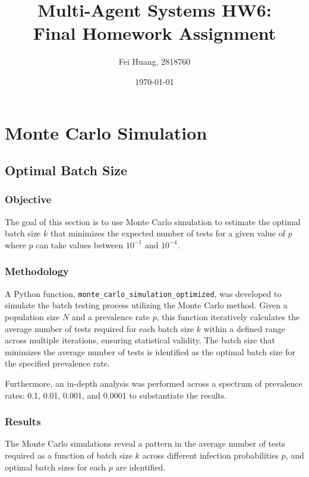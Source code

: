 \documentclass[12pt]{article}
\title{Multi-Agent Systems HW6:\\Final Homework Assignment}
\author{Fei Huang, 2818760}
\date{\today}
\begin{document}
\maketitle

\section{Monte Carlo Simulation}

\subsection{Optimal Batch Size}

\subsubsection*{Objective}
The goal of this section is to use Monte Carlo simulation to estimate the optimal batch size \( k \) that minimizes the expected number of tests for a given value of \( p \) where \( p \) can take values between \( 10^{-1} \) and \( 10^{-4} \).

\subsubsection*{Methodology}

A Python function, \texttt{monte\_carlo\_simulation\_optimized}, was developed to simulate the batch testing process utilizing the Monte Carlo method. Given a population size \( N \) and a prevalence rate \( p \), this function iteratively calculates the average number of tests required for each batch size \(k\) within a defined range across multiple iterations, ensuring statistical validity. The batch size that minimizes the average number of tests is identified as the optimal batch size for the specified prevalence rate.

Furthermore, an in-depth analysis was performed across a spectrum of prevalence rates: 0.1, 0.01, 0.001, and 0.0001 to substantiate the results.

\subsubsection*{Results}

The Monte Carlo simulations reveal a pattern in the average number of tests required as a function of batch size \( k \) across different infection probabilities \( p \), and optimal batch sizes for each \( p \) are identified.
\end{document}
